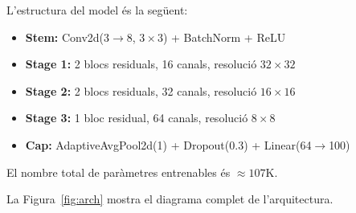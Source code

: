 \documentclass[9pt,a4paper,twoside]{tau-class/tau}
\begin{document}
        L'estructura del model és la següent:
        
        \begin{itemize}
            \item \textbf{Stem:} Conv2d(3$\to$8, $3{\times}3$) + BatchNorm + ReLU
            \item \textbf{Stage 1:} 2 blocs residuals, 16 canals, resolució $32{\times}32$
            \item \textbf{Stage 2:} 2 blocs residuals, 32 canals, resolució $16{\times}16$
            \item \textbf{Stage 3:} 1 bloc residual, 64 canals, resolució $8{\times}8$
            \item \textbf{Cap:} AdaptiveAvgPool2d(1) + Dropout(0.3) + Linear(64$\to$100)
        \end{itemize}
        
        El nombre total de paràmetres entrenables és $\approx 107\text{K}$.
        
        \noindent
        La Figura~\ref{fig:arch} mostra el diagrama complet de l'arquitectura.
\end{document}
